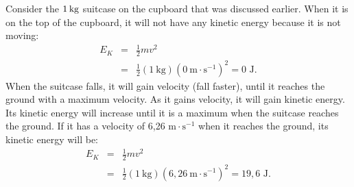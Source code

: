       \label{m38785*id66902}Consider the $1\phantom{\rule{2pt}{0ex}}\text{kg}$ suitcase on the cupboard that was discussed earlier.
When it is on the top of the cupboard, it will not have any kinetic energy because it is not moving:
\begin{eqnarray*}
E_{K} &=& \frac{1}{2}mv^{2} \\
& = & \frac{1}{2}(1~\text{kg})(0~\text{m} \cdot \text{s}^{-1})^{2} = 0 \text{ J}.
\end{eqnarray*}
When the suitcase falls, it will gain velocity (fall faster), until it reaches the ground with a maximum velocity.  
As it gains velocity, it will gain kinetic energy. 
Its kinetic energy will increase until it is a maximum when the suitcase reaches the ground.
If it has a velocity of 6,26 $\text{m} \cdot\text{s}^{-1}$ when it reaches the ground, its kinetic energy will be:
\begin{eqnarray*}
E_{K} &=& \frac{1}{2}mv^{2} \\
& = & \frac{1}{2}(1~\text{kg})(6,26~\text{m} \cdot\text{s}^{-1})^{2} = 19,6 \text{ J}.
\end{eqnarray*}

